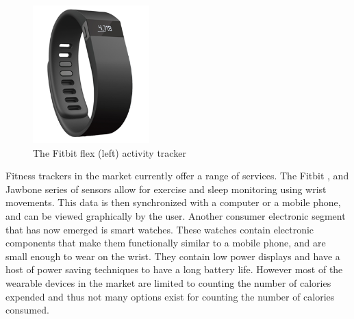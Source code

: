\begin{figure}
\begin{center}
\includegraphics[width=0.4\textwidth]{images/JawFit.png}
\caption{The Fitbit flex (left) activity tracker}
\label{fig:FitbitJawbone}

\end{center}
\end{figure}
Fitness trackers in the market currently offer a range of services. The Fitbit \cite{Web:FitBitOfficial},\cite{Web:FitbitFlex} and Jawbone \cite{Web:JawBoneWebsite} series of sensors allow for exercise and sleep monitoring using wrist movements. This data is then synchronized with a computer or a mobile phone, and can be viewed graphically by the user. Another consumer electronic segment that has now emerged is smart watches. These watches contain electronic components that make them functionally similar to a mobile phone, and are small enough to wear on the wrist. They contain low power displays and have a host of power saving techniques to have a long battery life. However most of the wearable devices in the market are limited to counting the number of calories expended and thus not many options exist for counting the number of calories consumed.

